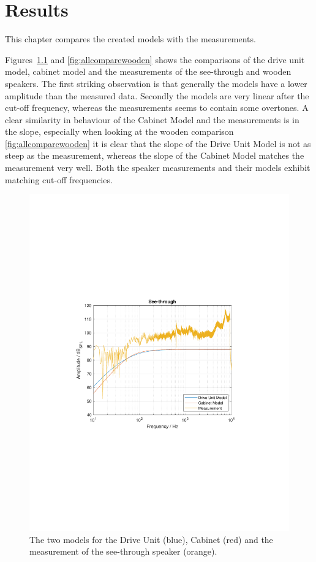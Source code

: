 
\chapter{Results}
\label{chap:results}
This chapter compares the created models with the measurements.

Figures~\ref{fig:allcompareseethrough} and \ref{fig:allcomparewooden} shows the comparisons of the drive unit model, cabinet model and the measurements of the see-through and wooden speakers.
The first striking observation is that generally the models have a lower amplitude than the measured data.
Secondly the models are very linear after the cut-off frequency, whereas the measurements seems to contain some overtones.
A clear similarity in behaviour of the Cabinet Model and the measurements is in the slope, especially when looking at the wooden comparison \cref{fig:allcomparewooden} it is clear that the slope of the Drive Unit Model is not as steep as the measurement, whereas the slope of the Cabinet Model matches the measurement very well.
Both the speaker measurements and their models exhibit matching cut-off frequencies.

\begin{figure}
	\centering
	\includegraphics[width=0.7\linewidth, clip, trim={3.9cm 8.4cm 4.5cm 8.5cm}]{gfx/Results/AllCompareSeeThrough.pdf}
	\caption{The two models for the Drive Unit (blue), Cabinet (red) and the measurement of the see-through speaker (orange).}
	\label{fig:allcompareseethrough}
\end{figure}


